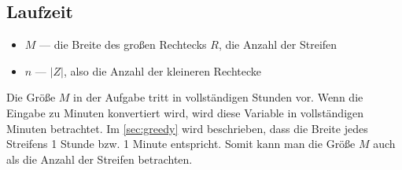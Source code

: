 \subsection{Laufzeit}
\begin{itemize}
	\item $M$ --- die Breite des großen Rechtecks $R$, die Anzahl der Streifen 
	\item $n$ --- $|Z|$, also die Anzahl der kleineren Rechtecke
\end{itemize}

Die Größe $M$ in der Aufgabe tritt in vollständigen Stunden vor.
Wenn die Eingabe zu Minuten konvertiert wird, wird diese Variable
in vollständigen Minuten betrachtet.
Im \cref{sec:greedy} wird beschrieben,
dass die Breite jedes Streifens 1 Stunde bzw. 1 Minute entspricht.
Somit kann man die Größe $M$ auch als die Anzahl der Streifen betrachten.


